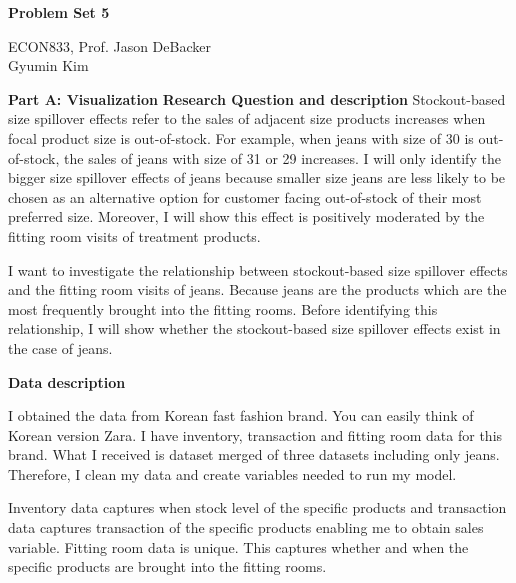 \documentclass[letterpaper,12pt]{article}
\theoremstyle{definition}
\begin{document}
	
	\begin{center}
		\textbf{\large{Problem Set 5}} \\
	\end{center}
	
	\begin{flushleft}
		ECON833, Prof. Jason DeBacker \\
		Gyumin Kim
	\end{flushleft}
	
	\vspace{5mm}
	
	\textbf{Part A: Visualization} 
		\textbf{Research Question and description}
     Stockout-based size spillover effects refer to the sales of adjacent size products increases when focal product size is out-of-stock. For example, when jeans with size of 30 is out-of-stock, the sales of jeans with size of 31 or 29 increases. I will only identify the bigger size spillover effects of jeans because smaller size jeans are less likely to be chosen as an alternative option for customer facing out-of-stock of their most preferred size. Moreover, I will show this effect is positively moderated by the fitting room visits of treatment products. 	 \vspace{1mm}
     
    
    I want to investigate the relationship between stockout-based size spillover effects and the fitting room visits of jeans. Because jeans are the products which are the most frequently brought into the fitting rooms. Before identifying this relationship, I will show whether the stockout-based size spillover effects exist in the case of jeans. 
    
     	\textbf{Data description}
     	
     I obtained the data from Korean fast fashion brand. You can easily think of Korean version Zara. I have inventory, transaction and fitting room data for this brand. What I received is dataset merged of three datasets including only jeans. Therefore, I clean my data and create variables needed to run my model. 
     
     Inventory data captures when stock level of the specific products and transaction data captures transaction of the specific products enabling me to obtain sales variable. Fitting room data is unique. This captures whether and when the specific products are brought into the fitting rooms.\vspace{1mm}
     
\end{document}
